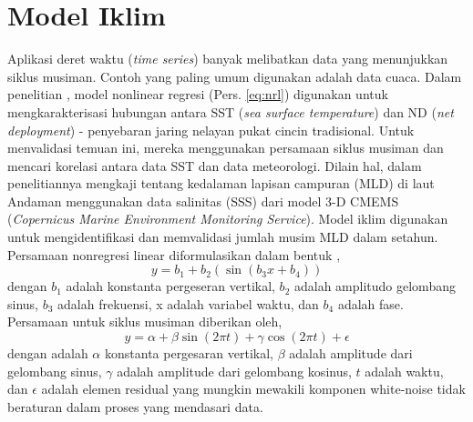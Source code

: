 \section[Model Iklim]{Model Iklim}
\begin{spacing}{1.5}
	Aplikasi deret waktu (\textit{time series}) banyak melibatkan data yang menunjukkan siklus musiman. Contoh yang paling umum digunakan adalah data cuaca. Dalam penelitian , model nonlinear regresi (Pers. \ref{eq:nrl}) digunakan untuk mengkarakterisasi hubungan antara SST (\textit{sea surface temperature}) dan ND (\textit{net deployment}) - penyebaran jaring nelayan pukat cincin tradisional. Untuk menvalidasi temuan ini, mereka menggunakan persamaan siklus musiman  dan mencari korelasi antara data SST dan data meteorologi. Dilain hal,  dalam penelitiannya mengkaji tentang kedalaman lapisan campuran (MLD) di laut Andaman menggunakan data salinitas (SSS) dari model 3-D CMEMS (\textit{Copernicus Marine Environment Monitoring Service}). Model iklim digunakan untuk mengidentifikasi dan memvalidasi jumlah musim MLD dalam setahun. Persamaan nonregresi linear  diformulasikan dalam bentuk ,
	\begin{equation}\label{eq:nrl}
		y = b_1 + b_2(\sin(b_3x+b_4))
	\end{equation}
	dengan $b_1$ adalah konstanta pergeseran vertikal, $b_2$ adalah amplitudo gelombang sinus, $b_3$ adalah frekuensi, x adalah variabel waktu, dan $b_4$ adalah fase.
	Persamaan untuk siklus musiman  diberikan oleh,
	\begin{equation}
		y = \alpha + \beta \sin(2\pi t)+\gamma \cos(2\pi t) + \epsilon
	\end{equation}
	dengan adalah $\alpha$ konstanta pergesaran vertikal, $\beta$ adalah amplitude dari gelombang sinus, $\gamma$ adalah amplitude dari gelombang kosinus, $t$ adalah waktu, dan $\epsilon$ adalah elemen residual yang mungkin mewakili komponen white-noise tidak beraturan dalam proses yang mendasari data.
\end{spacing}
\vspace{-0.1pc}
